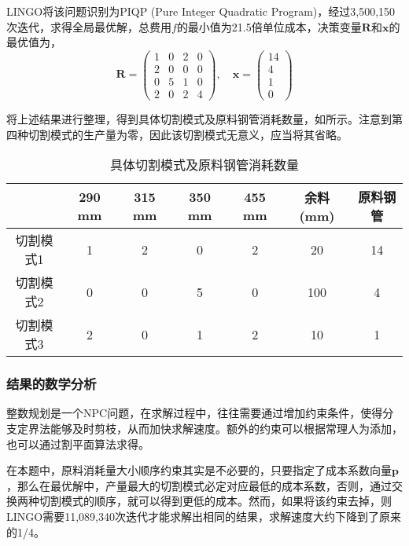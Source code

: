 LINGO将该问题识别为PIQP (Pure Integer Quadratic Program)，经过3,500,150次迭代，求得全局最优解，总费用$f$的最小值为21.5倍单位成本，决策变量$\mathbf{R}$和$\mathbf{x}$的最优值为，
\begin{equation}
    \mathbf{R} = \left(\begin{matrix}
        1 & 0 & 2 & 0\\
        2 & 0 & 0 & 0\\
        0 & 5 & 1 & 0\\
        2 & 0 & 2 & 4
    \end{matrix}\right)
    ,\quad
    \mathbf{x} = \left(\begin{matrix}
        14\\
        4\\
        1\\
        0
    \end{matrix}\right)
\end{equation}

将上述结果进行整理，得到具体切割模式及原料钢管消耗数量，如所示。注意到第四种切割模式的生产量为零，因此该切割模式无意义，应当将其省略。

\begin{table}[H]
    \centering
    \caption{具体切割模式及原料钢管消耗数量}
    \label{tab:ex11_result}
    \begin{tabular}{c|ccccc|c}
        \toprule
        & 290 mm & 315 mm & 350 mm & 455 mm & 余料 (mm) &
        原料钢管\tabularnewline
        \midrule
        切割模式1 & 1 & 2 & 0 & 2 & 20 & 14\tabularnewline
        切割模式2 & 0 & 0 & 5 & 0 & 100 & 4\tabularnewline
        切割模式3 & 2 & 0 & 1 & 2 & 10 & 1\tabularnewline
        \bottomrule
    \end{tabular}
\end{table}

\subsubsection{结果的数学分析}

整数规划是一个NPC问题，在求解过程中，往往需要通过增加约束条件，使得分支定界法能够及时剪枝，从而加快求解速度。额外的约束可以根据常理人为添加，也可以通过割平面算法求得。

在本题中，原料消耗量大小顺序约束其实是不必要的，只要指定了成本系数向量$\mathbf{p}$，那么在最优解中，产量最大的切割模式必定对应最低的成本系数，否则，通过交换两种切割模式的顺序，就可以得到更低的成本。然而，如果将该约束去掉，则LINGO需要11,089,340次迭代才能求解出相同的结果，求解速度大约下降到了原来的1/4。

